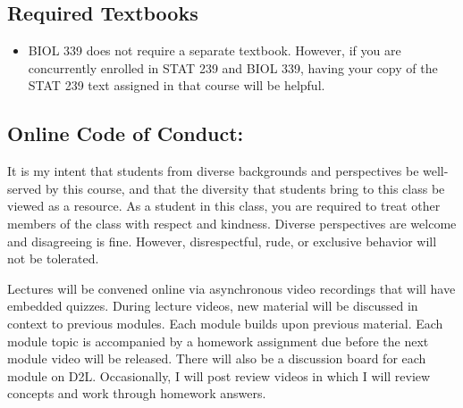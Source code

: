 \documentclass{tufte-handout}
\begin{document}
\begin{fullwidth}
\subsection{Required Textbooks}

\begin{itemize}
	\item BIOL 339 does not require a separate textbook. However, if you are concurrently enrolled in STAT 239 and BIOL 339, having your copy of the STAT 239 text assigned in that course will be helpful.
\end{itemize}










\subsection{Online Code of Conduct: } 

It is my intent that students from diverse backgrounds and perspectives be well-served by this course, and that the diversity that students bring to this class be viewed as a resource. As a student in this class, you are required to treat other members of the class with respect and kindness. Diverse perspectives are welcome and disagreeing is fine. However, disrespectful, rude, or exclusive behavior will not be tolerated. 




 Lectures will be convened online via asynchronous video recordings that will have embedded quizzes. During lecture videos, new material will be discussed in context to previous modules. Each module builds upon previous material. Each module topic is accompanied by a homework assignment due before the next module video will be released. There will also be a discussion board for each module on D2L. Occasionally, I will post review videos in which I will review concepts and work through homework answers. 

\end{fullwidth}
\end{document}
